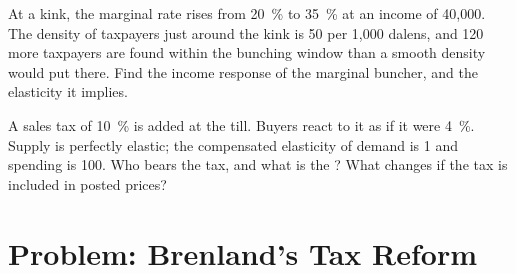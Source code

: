 \begin{exercise}[$\star\star\star$]\label{exo:b3:efficiency-cost-of-taxation:11}
At a kink, the marginal rate rises from 20~\% to 35~\% at an income of 40{,}000. The
density of taxpayers just around the kink is 50 per 1{,}000 dalens, and 120 more
taxpayers are found within the bunching window than a smooth density would put
there. Find the income response of the marginal buncher, and the elasticity it
implies.
\end{exercise}

\begin{exercise}[$\star\star\star$]\label{exo:b3:efficiency-cost-of-taxation:12}
A sales tax of 10~\% is added at the till. Buyers react to it as if it were 4~\%.
Supply is perfectly elastic; the compensated elasticity of demand is 1 and spending
is 100. Who bears the tax, and what is the ?
What changes if the tax is included in posted prices?
\end{exercise}

\section{Problem: Brenland's Tax Reform}\label{sec:b3:efficiency-cost-of-taxation:problem}

